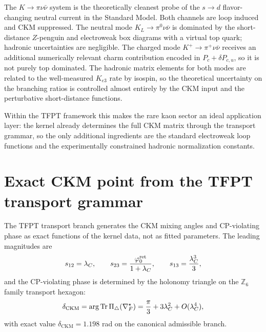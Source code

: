 The $K\to\pi\nu\bar\nu$ system is the theoretically cleanest probe of the
$s\to d$ flavor-changing neutral current in the Standard Model.
Both channels are loop induced and CKM suppressed.
The neutral mode $K_L\to\pi^0\nu\bar\nu$ is dominated by the
short-distance $Z$-penguin and electroweak box diagrams with a virtual
top quark; hadronic uncertainties are negligible.
The charged mode $K^+\to\pi^+\nu\bar\nu$ receives an additional
numerically relevant charm contribution encoded in $P_c+\delta P_{c,u}$,
so it is not purely top dominated.
The hadronic matrix elements for both modes are related to the
well-measured $K_{e3}$ rate by isospin, so the theoretical uncertainty
on the branching ratios is controlled almost entirely by the CKM input and
the perturbative short-distance functions.

Within the TFPT framework this makes the rare kaon sector an ideal
application layer: the kernel already determines the full CKM matrix
through the transport grammar, so the only additional ingredients are
the standard electroweak loop functions and the experimentally
constrained hadronic normalization constants.


\section{Exact CKM point from the TFPT transport grammar}
\label{sec:ckm}

The TFPT transport branch generates the CKM mixing angles and
CP-violating phase as exact functions of the kernel data, not as fitted
parameters. The leading magnitudes are
\begin{equation}
\label{eq:ckm-angles}
s_{12}=\lambda_C,
\qquad
s_{23}=\frac{\varphi_{0}^{\mathrm{ret}}}{1+\lambda_C},
\qquad
s_{13}=\frac{\lambda_C^3}{3},
\end{equation}
and the CP-violating phase is determined by the holonomy triangle on the
$\mathbb Z_6$ family transport hexagon:
\begin{equation}
\label{eq:ckm-phase}
\delta_{\mathrm{CKM}}
=
\arg\operatorname{Tr}\Pi_\triangle(\nabla_F^\star)
=
\frac{\pi}{3}+3\lambda_C^2+O(\lambda_C^4),
\end{equation}
with exact value $\delta_{\mathrm{CKM}}=\num{1.198}$ rad on the canonical admissible branch.

